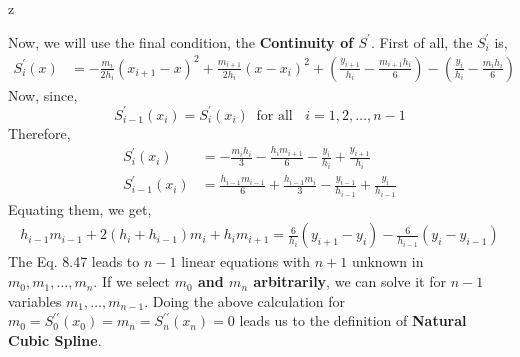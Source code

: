 z\documentclass[a4paper,12pt,twoside]{book}
\newcommand{\nll}[0]{\newline\newline}
\begin{document}
Now, we will use the final condition, the \textbf{Continuity of $S^\prime$}. First of all, the $S_i^\prime$ is,
\begin{equation}
    \begin{split}
        S_i^\prime(x) &= -\frac{m_i}{2h_i}(x_{i+1}-x)^2 + \frac{m_{i+1}}{2h_i}(x-x_i)^2 + \left( \frac{y_{i+1}}{h_i} - \frac{m_{i+1}h_i}{6} \right) - \left( \frac{y_i}{h_i} - \frac{m_ih_i}{6} \right)
    \end{split}
\end{equation}
Now, since,
\[ S_{i-1}^\prime (x_i) = S_i^\prime(x_i) \;\;\text{for all }\;\; i = 1,2,\dots,n-1\] 
Therefore,
\begin{equation}
    \begin{split}
        S_{i}^\prime(x_i) &= -\frac{m_i h_i}{3} -\frac{h_im_{i+1}}{6} -\frac{y_i}{h_i} + \frac{y_{i+1}}{h_i}\\
        S_{i-1}^\prime(x_i) &= \frac{h_{i-1}m_{i-1}}{6} + \frac{h_{i-1}m_i}{3} - \frac{y_{i-1}}{h_{i-1}} + \frac{y_i}{h_{i-1}}
    \end{split}
\end{equation}
Equating them, we get,
\begin{equation}
    \begin{split}
       \boxed{ h_{i-1}m_{i-1} + 2(h_i + h_{i-1})m_i + h_im_{i+1} = \frac{6}{h_i}(y_{i+1}-y_i) - \frac{6}{h_{i-1}}(y_i - y_{i-1})}
    \end{split}
\end{equation}
The Eq. 8.47 leads to $n-1$ linear equations with $n+1$ unknown in $m_0, m_1,\dots, m_n$. If we select \textbf{$m_0$ and $m_n$ arbitrarily}, we can solve it for $n-1$ variables $m_1,\dots,m_{n-1}$.
\nll
Doing the above calculation for $m_0 = S^{\prime\prime}_0(x_0) = m_n = S^{\prime\prime}_n(x_n) = 0$ leads us to the definition of \textbf{Natural Cubic Spline}.
\end{document}
